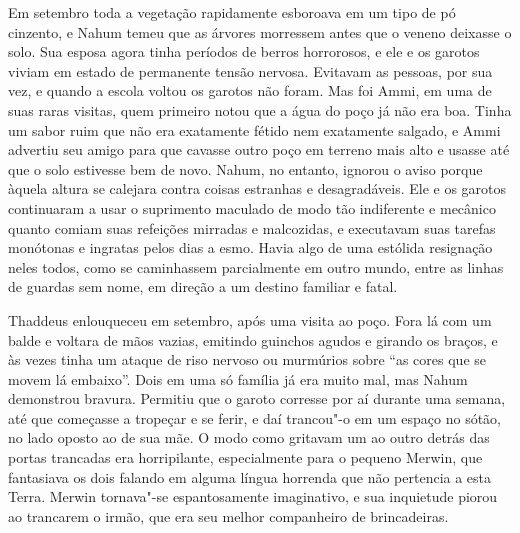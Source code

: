 Em setembro toda a vegetação rapidamente esboroava em um tipo de pó
cinzento, e Nahum temeu que as árvores morressem antes que o veneno
deixasse o solo. Sua esposa agora tinha períodos de berros horrorosos, e
ele e os garotos viviam em estado de permanente tensão nervosa. Evitavam
as pessoas, por sua vez, e quando a escola voltou os garotos não foram.
Mas foi Ammi, em uma de suas raras visitas, quem primeiro notou que a
água do poço já não era boa. Tinha um sabor ruim que não era exatamente
fétido nem exatamente salgado, e Ammi advertiu seu amigo para que
cavasse outro poço em terreno mais alto e usasse até que o solo
estivesse bem de novo. Nahum, no entanto, ignorou o aviso porque àquela
altura se calejara contra coisas estranhas e desagradáveis. Ele e os
garotos continuaram a usar o suprimento maculado de modo tão indiferente
e mecânico quanto comiam suas refeições mirradas e malcozidas, e
executavam suas tarefas monótonas e ingratas pelos dias a esmo. Havia
algo de uma estólida resignação neles todos, como se caminhassem
parcialmente em outro mundo, entre as linhas de guardas sem nome, em
direção a um destino familiar e fatal.

Thaddeus enlouqueceu em setembro, após uma visita ao poço. Fora lá com
um balde e voltara de mãos vazias, emitindo guinchos agudos e girando os
braços, e às vezes tinha um ataque de riso nervoso ou murmúrios sobre
``as cores que se movem lá embaixo''. Dois em uma só família já era
muito mal, mas Nahum demonstrou bravura. Permitiu que o garoto corresse
por aí durante uma semana, até que começasse a tropeçar e se ferir, e
daí trancou"-o em um espaço no sótão, no lado oposto ao de sua mãe. O
modo como gritavam um ao outro detrás das portas trancadas era
horripilante, especialmente para o pequeno Merwin, que fantasiava os
dois falando em alguma língua horrenda que não pertencia a esta Terra.
Merwin tornava"-se espantosamente imaginativo, e sua inquietude piorou ao
trancarem o irmão, que era seu melhor companheiro de brincadeiras.

